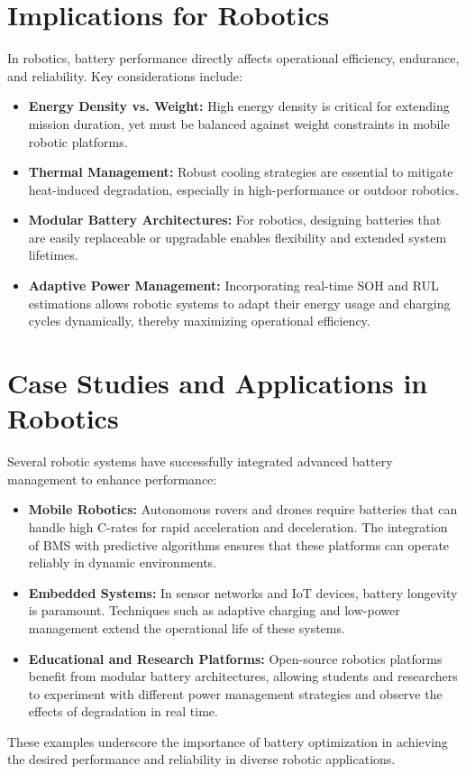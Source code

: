 \section{Implications for Robotics}
In robotics, battery performance directly affects operational efficiency, endurance, and reliability. Key considerations include:
\begin{itemize}
    \item \textbf{Energy Density vs. Weight:} High energy density is critical for extending mission duration, yet must be balanced against weight constraints in mobile robotic platforms.
    \item \textbf{Thermal Management:} Robust cooling strategies are essential to mitigate heat-induced degradation, especially in high-performance or outdoor robotics.
    \item \textbf{Modular Battery Architectures:} For robotics, designing batteries that are easily replaceable or upgradable enables flexibility and extended system lifetimes.
    \item \textbf{Adaptive Power Management:} Incorporating real-time SOH and RUL estimations allows robotic systems to adapt their energy usage and charging cycles dynamically, thereby maximizing operational efficiency.
\end{itemize}

\section{Case Studies and Applications in Robotics}
Several robotic systems have successfully integrated advanced battery management to enhance performance:
\begin{itemize}
    \item \textbf{Mobile Robotics:} Autonomous rovers and drones require batteries that can handle high C-rates for rapid acceleration and deceleration. The integration of BMS with predictive algorithms ensures that these platforms can operate reliably in dynamic environments.
    \item \textbf{Embedded Systems:} In sensor networks and IoT devices, battery longevity is paramount. Techniques such as adaptive charging and low-power management extend the operational life of these systems.
    \item \textbf{Educational and Research Platforms:} Open-source robotics platforms benefit from modular battery architectures, allowing students and researchers to experiment with different power management strategies and observe the effects of degradation in real time.
\end{itemize}
These examples underscore the importance of battery optimization in achieving the desired performance and reliability in diverse robotic applications.

